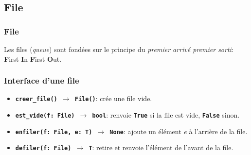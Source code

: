 \documentclass[svgnames,11pt]{beamer}
\begin{document}
\subsection{File}
\begin{frame}
    \frametitle{File}

    \begin{aretenir}[]
        Les files (\emph{queue}) sont fondées sur le principe du \emph{premier arrivé premier sorti}: \textbf{F}irst \textbf{I}n \textbf{F}irst \textbf{O}ut.
    \end{aretenir}

\end{frame}
\begin{frame}
    \frametitle{}

   \begin{center}
   \end{center} 

\end{frame}
\begin{frame}
    \frametitle{}

    \begin{center}
    

    \end{center}
\end{frame}
\begin{frame}
    \frametitle{Interface d'une file}

    \begin{itemize}
        \item \texttt{\textbf{creer\_file() $\rightarrow$ File()}}: crée une file vide.
        \item \texttt{\textbf{est\_vide(f: File) $\rightarrow$ bool}}: renvoie \textbf{\texttt{True}} si la file est vide, \textbf{\texttt{False}} sinon.
        \item \texttt{\textbf{enfiler(f: File, e: T) $\rightarrow$ None}}: ajoute un élément \emph{e} à l'arrière de la file.
        \item \texttt{\textbf{defiler(f: File) $\rightarrow$ T}}: retire et renvoie l'élément de l'avant de la file.
        \end{itemize}

\end{frame}
\end{document}
